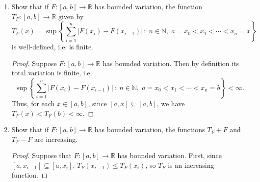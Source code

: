 \documentclass[11pt,oneside,english]{amsart}
\theoremstyle{definition}
\newcommand{\lom}[2]{\lim_{{#1}\rightarrow{#2}}}
\newcommand{\MB}[1]{\mathbb{#1}}
\begin{document}
\begin{enumerate}
\begin{proof}
Thus, $F(x)$ is just the Lebesgue measure of the interval $[a,x]$, i.e. its length. We show this is differentiable directly:

\[
F'(x)=\lom{h}{0}\frac{F(x+h)-F(x)}{h}=\lom{h}{0}\frac{1}{h}\left(m([a,x+h])-m([a,x])\right)=\lom{h}{0}\frac{1}{h}\,m([x,x+h])=\lom{h}{0}\frac{1}{h}\cdot h=1.
\]

Therefore, $F$ is differentiable at every $x\in(a,b)$, and since $f(x)=1$ on $\MB{Q}^c$, $F'(x)=f(x)$ a.e.
\end{proof}

\pagebreak

\item Show that if $F:[a,b]\rightarrow \MB{R}$ has bounded variation, the function $T_F:[a,b]\rightarrow\MB{R}$ given by
\[
T_F(x) = \sup \left\{   \sum_{i = 1}^n |F(x_i) - F(x_{i-1})| \, : \; n \in \MB{N}, \;  a = x_0 < x_1 < \cdots < x_n = x \right\}
\]
is well-defined, i.e. is finite.

\begin{proof}
Suppose $F:[a,b]\rightarrow \MB{R}$ has bounded variation. Then by definition its total variation is finite, i.e.
\[
\sup \left\{   \sum_{i = 1}^n |F(x_i) - F(x_{i-1})| \, : \; n \in \MB{N}, \;  a = x_0 < x_1 < \cdots < x_n = b \right\}<\infty.
\]
Thus, for each $x\in[a,b]$, since $[a,x]\subseteq [a,b]$, we have  $T_F(x)<T_F(b)<\infty$.
\end{proof}


%
%

\item Show that if $F:[a,b]\rightarrow\MB{R}$ has bounded variation, the functions $T_F+F$ and $T_F-F$ are increasing.


\begin{proof}
Suppose that $F:[a,b]\rightarrow\MB{R}$ has bounded variation. First, since $[a,x_{i-1}]\subseteq[a,x_i]$, $T_F(x_{i-1})\leq T_F(x_i)$, so $T_F$ is an increasing function. 


\end{proof}
\end{enumerate}
\end{document}

